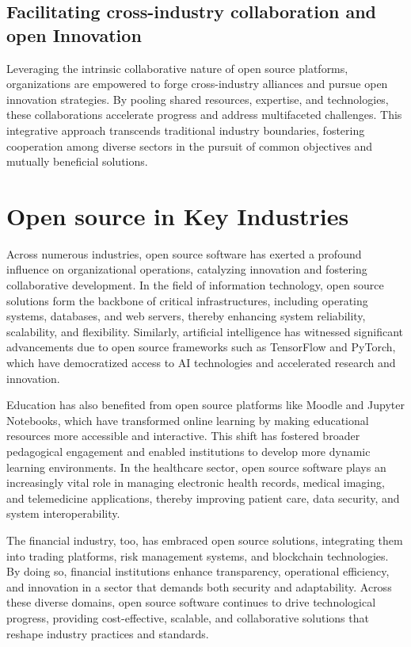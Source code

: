 \cite{studiolabs_open_source_startups_2024}

\subsection{Facilitating cross-industry collaboration and open Innovation}

Leveraging the intrinsic collaborative nature of open source platforms, organizations are empowered to forge cross-industry alliances and pursue open innovation 
strategies. By pooling shared resources, expertise, and technologies, these collaborations accelerate progress and address multifaceted challenges. 
This integrative approach transcends traditional industry boundaries, fostering cooperation among diverse sectors in the pursuit of common objectives and mutually beneficial solutions.

\section{Open source in Key Industries}
Across numerous industries, open source software has exerted a profound influence on organizational operations, catalyzing innovation and fostering collaborative development. 
In the field of information technology, open source solutions form the backbone of critical infrastructures, including operating systems, databases, and web servers, 
thereby enhancing system reliability, scalability, and flexibility. Similarly, artificial intelligence has witnessed significant advancements due to open source 
frameworks such as TensorFlow and PyTorch, which have democratized access to AI technologies and accelerated research and innovation.  

Education has also benefited from open source platforms like Moodle and Jupyter Notebooks, which have transformed online learning by making educational 
resources more accessible and interactive. This shift has fostered broader pedagogical engagement and enabled institutions to develop more dynamic learning environments. 
In the healthcare sector, open source software plays an increasingly vital role in managing electronic health records, medical imaging, and telemedicine applications, 
thereby improving patient care, data security, and system interoperability.  

The financial industry, too, has embraced open source solutions, integrating them into trading platforms, risk management systems, and blockchain technologies. 
By doing so, financial institutions enhance transparency, operational efficiency, and innovation in a sector that demands both security and adaptability. 
Across these diverse domains, open source software continues to drive technological progress, providing cost-effective, scalable, and collaborative solutions that reshape 
industry practices and standards.

